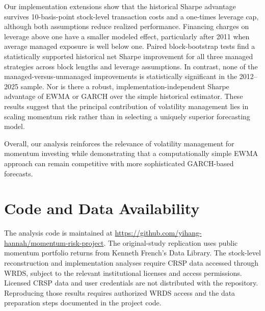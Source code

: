 \documentclass[11pt]{article}
\begin{document}
Our implementation extensions show that the historical Sharpe advantage survives 10-basis-point stock-level transaction costs and a one-times leverage cap, although both assumptions reduce realized performance. Financing charges on leverage above one have a smaller modeled effect, particularly after 2011 when average managed exposure is well below one. Paired block-bootstrap tests find a statistically supported historical net Sharpe improvement for all three managed strategies across block lengths and leverage assumptions. In contrast, none of the managed-versus-unmanaged improvements is statistically significant in the 2012--2025 sample. Nor is there a robust, implementation-independent Sharpe advantage of EWMA or GARCH over the simple historical estimator. These results suggest that the principal contribution of volatility management lies in scaling momentum risk rather than in selecting a uniquely superior forecasting model.

Overall, our analysis reinforces
the relevance of volatility
management for momentum investing
while demonstrating that a
computationally simple EWMA
approach can remain competitive
with more sophisticated
GARCH-based forecasts.

\section*{Code and Data Availability}
The analysis code is maintained at
\url{https://github.com/yihang-hannah/momentum-risk-project}.
The original-study replication uses public momentum portfolio
returns from Kenneth French's Data Library. The stock-level
reconstruction and implementation analyses require CRSP data
accessed through WRDS, subject to the relevant institutional
licenses and access permissions. Licensed CRSP data and user
credentials are not distributed with the repository. Reproducing
those results requires authorized WRDS access and the data
preparation steps documented in the project code.



\end{document}
